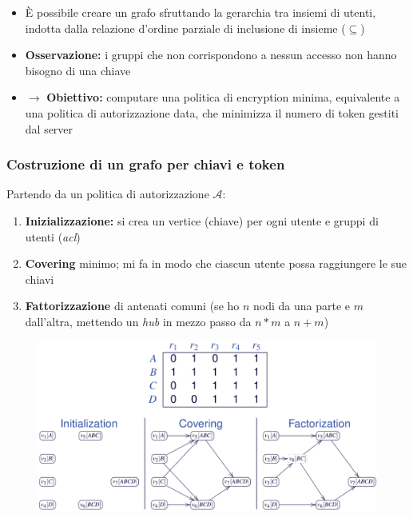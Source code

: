 \documentclass{report}
\begin{document}
\begin{itemize}
    \item È possibile creare un grafo sfruttando la gerarchia tra insiemi di utenti, indotta
    dalla relazione d'ordine parziale di inclusione di insieme ($\subseteq$)
    \item \textbf{Osservazione:} i gruppi che non corrispondono a nessun accesso non hanno bisogno di una chiave 
    \item $\rightarrow$ \textbf{Obiettivo:} computare una politica di encryption minima, equivalente a una politica di autorizzazione data, 
    che minimizza il numero di token gestiti dal server
\end{itemize}

\subsubsection{Costruzione di un grafo per chiavi e token}
Partendo da un politica di autorizzazione $\mathcal{A}$:
\begin{enumerate}
    \item \textbf{Inizializzazione:} si crea un vertice (chiave) per ogni utente e gruppi di utenti (\textit{acl})
    \item \textbf{Covering} minimo; mi fa in modo che ciascun utente possa raggiungere le sue chiavi
    \item \textbf{Fattorizzazione} di antenati comuni (se ho $n$ nodi da una parte e $m$ dall'altra, mettendo un \textit{hub} in mezzo passo da $n*m$ a $n+m$)
\end{enumerate}

\begin{figure}[ht]
    \centering
    \includegraphics[width=0.91\linewidth]{images/encryption/graph.png}
\end{figure}
\end{document}
